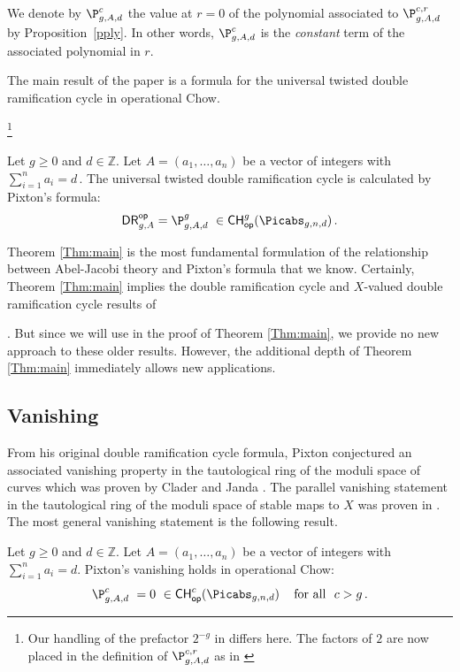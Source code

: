 We denote by $\P_{g,A,d}^c$ the value at $r=0$
of the polynomial associated to $\P_{g,A,d}^{c,r}$ by Proposition~\ref{pply}. In other words, $\P_{g,A,d}^c$ is the {\em constant} term of the associated polynomial in $r$.

The main result of the paper is a
 formula for the universal twisted double ramification cycle in operational Chow.{\footnote{Our
handling of the prefactor $2^{-g}$ in \cite[Theorem 1]{Janda2016Double-ramifica} differs here.
The factors of $2$ are now placed in the definition of $\P_{g,A,d}^{c,r}$
as in \cite{Janda2018Double-ramifica}}


\begin{theorem}
\notready \label{Thm:main}
Let $g\geq 0$ and $d\in \mathbb{Z}$.
Let $A=(a_1,\ldots,a_n)$ be a vector of integers with
$\sum_{i=1}^n a_i=d\,$.
The universal twisted double ramification cycle is calculated by Pixton's formula:
$$\mathsf{DR}^{\mathsf{op}}_{g,A} =\P_{g,A,d}^g\
\in {\mathsf{CH}}^g_{\mathsf{op}}(\Picabs_{g,n,d})\, .$$
\end{theorem}



Theorem \ref{Thm:main} is the most fundamental formulation of the relationship
between Abel-Jacobi theory and Pixton's formula that we know. Certainly,
Theorem \ref{Thm:main}
implies the double ramification cycle and $X$-valued
double ramification cycle results of \cite{Janda2016Double-ramifica,Janda2018Double-ramifica} }. But since we will
use \cite{Janda2018Double-ramifica} in the proof of Theorem \ref{Thm:main}, we provide no new approach to
these older results. However, the additional depth of Theorem \ref{Thm:main} immediately
allows new applications.


\subsection{Vanishing}
From his original double
ramification cycle formula,
Pixton conjectured an associated
vanishing property in the
tautological ring of the moduli
space of curves which
was proven by Clader and Janda \cite{cj}.
The parallel vanishing statement
in the tautological ring of the
moduli space of stable maps to $X$
was proven in \cite{Bae}.
The most general vanishing
statement is the following
result.


\begin{theorem}
\notready \label{Thm:mainvan}
Let $g\geq 0$ and $d\in \mathbb{Z}$.
Let $A=(a_1,\ldots,a_n)$ be a vector of integers with
$\sum_{i=1}^n a_i=d$.
 Pixton's vanishing holds
 in operational Chow:
$$ \P_{g,A,d}^c\ = 0 \
\in {\mathsf{CH}}^c_{\mathsf{op}}(\Picabs_{g,n,d})\, \ \ \
{\text{for all}} \ \ c>g\, .
$$
\end{theorem}





